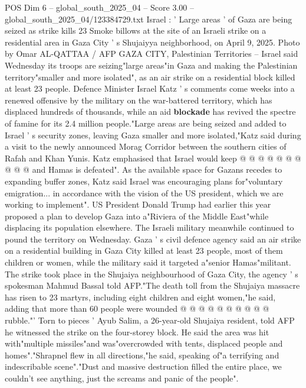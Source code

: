 \begin{textsample}{POS Dim 6 – global\_south\_2025\_04 – Score 3.00 – global\_south\_2025\_04/123384729.txt}  \label{ex:f6_pos_287}
Israel : ' Large areas ' of Gaza are being seized as strike kills 23 Smoke billows at the site of an Israeli strike on a residential area in Gaza City ' s Shujaiyya neighborhood, on April 9, 2025.
Photo by Omar AL-QATTAA / AFP GAZA CITY, Palestinian Territories -- Israel said Wednesday its troops are seizing"large areas"in Gaza and making the Palestinian territory"smaller and more isolated", as an air strike on a residential block killed at least 23 people.
Defence Minister Israel Katz ' s comments come weeks into a renewed offensive by the military on the war-battered territory, which has displaced hundreds of thousands, while an aid \textbf{blockade} has revived the spectre of famine for its 2.4 million people."Large areas are being seized and added to Israel ' s security zones, leaving Gaza smaller and more isolated,"Katz said during a visit to the newly announced Morag Corridor between the southern cities of Rafah and Khan Yunis.
Katz emphasised that Israel would keep @ @ @ @ @ @ @ @ @ @ and Hamas is defeated".
As the available space for Gazans recedes to expanding buffer zones, Katz said Israel was encouraging plans for"voluntary emigration... in accordance with the vision of the US president, which we are working to implement".
US President Donald Trump had earlier this year proposed a plan to develop Gaza into a"Riviera of the Middle East"while displacing its population elsewhere.
The Israeli military meanwhile continued to pound the territory on Wednesday.
Gaza ' s civil defence agency said an air strike on a residential building in Gaza City killed at least 23 people, most of them children or women, while the military said it targeted a"senior Hamas"militant.
The strike took place in the Shujaiya neighbourhood of Gaza City, the agency ' s spokesman Mahmud Bassal told AFP."The death toll from the Shujaiya massacre has risen to 23 martyrs, including eight children and eight women,"he said, adding that more than 60 people were wounded @ @ @ @ @ @ @ @ @ @ rubble."' Torn to pieces ' Ayub Salim, a 26-year-old Shujaiya resident, told AFP he witnessed the strike on the four-storey block.
He said the area was hit with"multiple missiles"and was"overcrowded with tents, displaced people and homes"."Shrapnel flew in all directions,"he said, speaking of"a terrifying and indescribable scene"."Dust and massive destruction filled the entire place, we couldn't see anything, just the screams and panic of the people".

\end{textsample}
